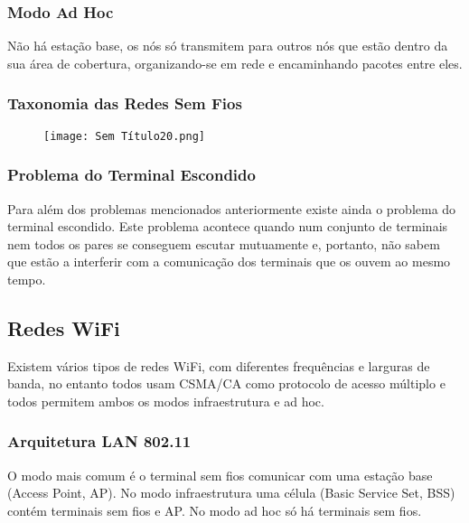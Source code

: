 \documentclass[10pt,a4paper]{report}
\begin{document}
\subsubsection{Modo Ad Hoc}
Não há estação base, os nós só transmitem para outros nós que estão dentro da sua área de cobertura, organizando-se em rede e encaminhando pacotes entre eles.
\subsubsection{Taxonomia das Redes Sem Fios}
\begin{figure}[H]
\centering
\texttt{[image: Sem Título20.png]}
\end{figure}
\subsubsection{Problema do Terminal Escondido}
Para além dos problemas mencionados anteriormente existe ainda o problema do terminal escondido. Este problema acontece quando num conjunto de terminais nem todos os pares se conseguem escutar mutuamente e, portanto, não sabem que estão a interferir com a comunicação dos terminais que os ouvem ao mesmo tempo.
\subsection{Redes WiFi}
Existem vários tipos de redes WiFi, com diferentes frequências e larguras de banda, no entanto todos usam CSMA/CA como protocolo de acesso múltiplo e todos permitem ambos os modos infraestrutura e ad hoc.
\subsubsection{Arquitetura LAN 802.11}
O modo mais comum é o terminal sem fios comunicar com uma estação base (Access Point, AP). No modo infraestrutura uma célula (Basic Service Set, BSS) contém terminais sem fios e AP. No modo ad hoc só há terminais sem fios.
\end{document}

